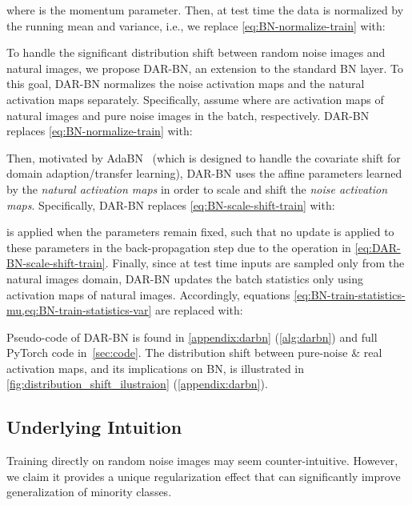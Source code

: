 \documentclass[nohyperref]{article}
\theoremstyle{plain}
\theoremstyle{definition}
\theoremstyle{remark}
\begin{document}
where  is the momentum parameter. Then, at test time the data is normalized by the running mean and variance, i.e., we replace \cref{eq:BN-normalize-train} with:
\vspace*{-0.2cm}

To handle the significant distribution shift between random noise images and natural images, we propose DAR-BN, an extension to the standard BN layer. To this goal, DAR-BN normalizes the noise activation maps and the natural activation maps separately. Specifically, assume  where  are activation maps of natural images and pure noise images in the batch, respectively. DAR-BN replaces \cref{eq:BN-normalize-train} with:

\vspace{-0.1cm}

Then, motivated by AdaBN~\cite{li2016revisiting} (which is designed to handle the covariate shift for domain adaption/transfer learning), DAR-BN uses the affine parameters learned by the \textit{natural activation maps} in order to scale and shift the \textit{noise activation maps}. Specifically, DAR-BN replaces \cref{eq:BN-scale-shift-train} with:
\vspace*{-0.2cm}

\vspace*{-0.3cm}

 is applied when the parameters  remain fixed, such that no update is applied to these parameters in the back-propagation step due to the operation in \cref{eq:DAR-BN-scale-shift-train}.
Finally, since at test time inputs are sampled only from the natural images domain, DAR-BN updates the batch statistics only using activation maps of natural images. Accordingly, equations \cref{eq:BN-train-statistics-mu,eq:BN-train-statistics-var} are replaced with:
\vspace*{-0.2cm}

\vspace*{-0.3cm}

Pseudo-code of DAR-BN is found in \cref{appendix:darbn} (\cref{alg:darbn}) and full PyTorch code  in~\cref{sec:code}.
The distribution shift between pure-noise \& real  activation maps, and its implications on BN, is illustrated in \cref{fig:distribution_shift_ilustraion} (\cref{appendix:darbn}).

\vspace{-0.3em}
\subsection{Underlying Intuition}\label{sec:intuition}
\vspace{-0.3em}
Training directly on random noise images may seem counter-intuitive. However, we claim it provides a unique regularization effect that can significantly improve generalization of minority classes.
\end{document}
